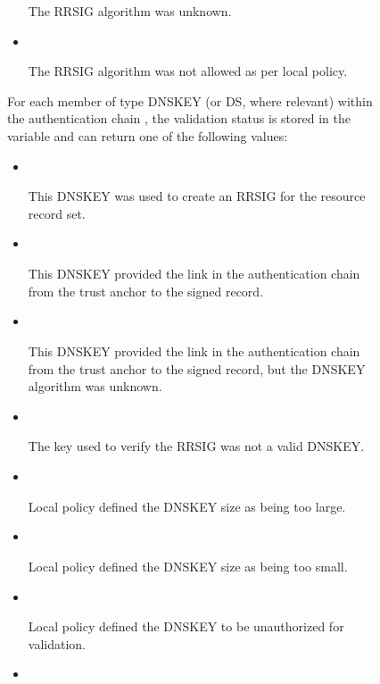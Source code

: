 \begin{description}
\begin{description}
\begin{itemize}
The RRSIG algorithm was unknown.

\item {}\verb" "

The RRSIG algorithm was not allowed as per local policy.

\end{itemize}

For each  member of type DNSKEY (or DS, where relevant) within the
authentication chain , the validation status is stored in
the variable  and can return one of the following values:

\begin{itemize}

\item {}\verb" "

This DNSKEY was used to create an RRSIG for the resource record set.

\item {}\verb" "

This DNSKEY provided the link in the authentication chain from the trust
anchor to the signed record.

\item {}\verb" "

This DNSKEY provided the link in the authentication chain from the trust
anchor to the signed record, but the DNSKEY algorithm was unknown.

\item {}\verb" "

The key used to verify the RRSIG was not a valid DNSKEY.

\item {}\verb" "

Local policy defined the DNSKEY size as being too large.

\item {}\verb" "

Local policy defined the DNSKEY size as being too small.

\item {}\verb" "

Local policy defined the DNSKEY to be unauthorized for validation.

\item {}\verb" "


\end{itemize}
\end{description}
\end{description}
